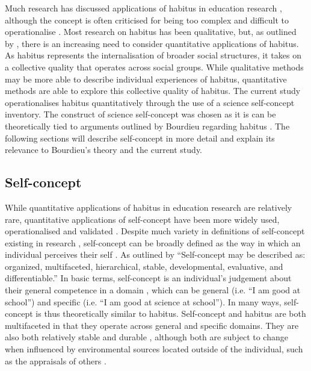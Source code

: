Much research has discussed applications of habitus in education research \citep{Reay_2004,Nash1999}, although the concept is often criticised for being too complex \citep{goldhaber2000does} and difficult to operationalise \citep{dumais2002cultural}. Most research on habitus has been qualitative, but, as outlined by \cite{mu2014heritage}, there is an increasing need to consider quantitative applications of habitus. As habitus represents the internalisation of broader social structures, it takes on a collective quality that operates across social groups. While qualitative methods may be more able to describe individual experiences of habitus, quantitative methods are able to explore this collective quality of habitus. The current study  operationalises habitus quantitatively through the use of a science self-concept inventory. The construct of science self-concept was chosen as it is can be theoretically tied to arguments outlined by Bourdieu regarding habitus \citep{mu2014heritage,bodovski2014adolescents}. The following sections will describe self-concept in more detail and explain its relevance to Bourdieu's theory and the current study.   

\subsection*{Self-concept}
\label{selfconcept}
While quantitative applications of habitus in education research are relatively rare, quantitative applications of self-concept have been more widely used, operationalised and validated \cite[e.g.][]{marsh2014academic,hattie2014self}.   Despite much variety in definitions of self-concept existing in research \citep{shavelson1976self}, self-concept can be broadly defined as the way in which an individual perceives their self \citep{rosenberg1979conceiving,shavelson1976self}.  As outlined by \citet[p.488]{shavelson1976self} ``Self-concept may be described as: organized, multifaceted, hierarchical, stable, developmental, evaluative, and differentiable.'' In basic terms, self-concept is an individual's judgement about their general competence in a domain \citep{jansen2015students}, which can be general (i.e. ``I am good at school'') and specific (i.e. ``I am good at science at school''). In many ways, self-concept is thus theoretically similar to habitus. Self-concept \citep[p.488]{shavelson1976self} and habitus \citep{Nash1999} are both multifaceted in that they operate across general and specific domains. They are also both relatively stable \citep[p.488]{shavelson1976self} and durable \citep{Bourdieu1984}, although both are subject to change when influenced by environmental sources located outside of the individual, such as the appraisals of others \citep{bong2003academic}. 

